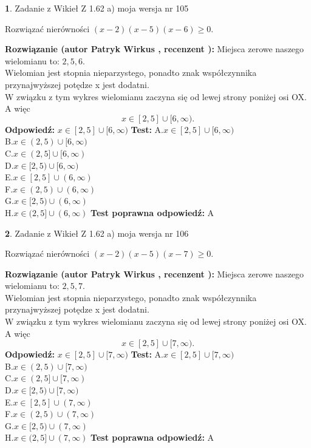 \documentclass[12pt, a4paper]{article}
\theoremstyle{definition} %
\newtheorem{zad}{}
\newcommand{\zadStart}[1]{\begin{zad}#1\newline}
\newcommand{\zadStop}{\end{zad}}
\newcommand{\rozwStart}[2]{\noindent \textbf{Rozwiązanie (autor #1 , recenzent #2): }\newline}
\newcommand{\rozwStop}{\newline}
\newcommand{\odpStart}{\noindent \textbf{Odpowiedź:}\newline}
\newcommand{\odpStop}{\newline}
\newcommand{\testStart}{\noindent \textbf{Test:}\newline}
\newcommand{\testStop}{\newline}
\newcommand{\kluczStart}{\noindent \textbf{Test poprawna odpowiedź:}\newline}
\newcommand{\kluczStop}{\newline}
\begin{document}
\zadStart{Zadanie z Wikieł Z 1.62 a) moja wersja nr 105}

Rozwiązać nierówności $(x-2)(x-5)(x-6)\ge0$.
\zadStop
\rozwStart{Patryk Wirkus}{}
Miejsca zerowe naszego wielomianu to: $2, 5, 6$.\\
Wielomian jest stopnia nieparzystego, ponadto znak współczynnika przy\linebreak najwyższej potędze x jest dodatni.\\ W związku z tym wykres wielomianu zaczyna się od lewej strony poniżej osi OX. A więc $$x \in [2,5] \cup [6,\infty).$$
\rozwStop
\odpStart
$x \in [2,5] \cup [6,\infty)$
\odpStop
\testStart
A.$x \in [2,5] \cup [6,\infty)$\\
B.$x \in (2,5) \cup [6,\infty)$\\
C.$x \in (2,5] \cup [6,\infty)$\\
D.$x \in [2,5) \cup [6,\infty)$\\
E.$x \in [2,5] \cup (6,\infty)$\\
F.$x \in (2,5) \cup (6,\infty)$\\
G.$x \in [2,5) \cup (6,\infty)$\\
H.$x \in (2,5] \cup (6,\infty)$
\testStop
\kluczStart
A
\kluczStop



\zadStart{Zadanie z Wikieł Z 1.62 a) moja wersja nr 106}

Rozwiązać nierówności $(x-2)(x-5)(x-7)\ge0$.
\zadStop
\rozwStart{Patryk Wirkus}{}
Miejsca zerowe naszego wielomianu to: $2, 5, 7$.\\
Wielomian jest stopnia nieparzystego, ponadto znak współczynnika przy\linebreak najwyższej potędze x jest dodatni.\\ W związku z tym wykres wielomianu zaczyna się od lewej strony poniżej osi OX. A więc $$x \in [2,5] \cup [7,\infty).$$
\rozwStop
\odpStart
$x \in [2,5] \cup [7,\infty)$
\odpStop
\testStart
A.$x \in [2,5] \cup [7,\infty)$\\
B.$x \in (2,5) \cup [7,\infty)$\\
C.$x \in (2,5] \cup [7,\infty)$\\
D.$x \in [2,5) \cup [7,\infty)$\\
E.$x \in [2,5] \cup (7,\infty)$\\
F.$x \in (2,5) \cup (7,\infty)$\\
G.$x \in [2,5) \cup (7,\infty)$\\
H.$x \in (2,5] \cup (7,\infty)$
\testStop
\kluczStart
A
\kluczStop
\end{document}
